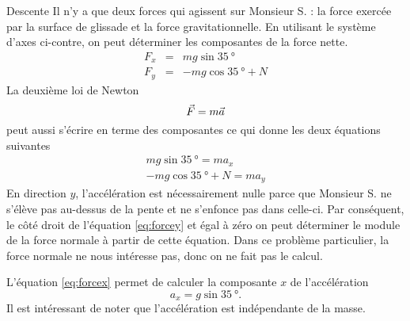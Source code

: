 \documentclass{tufte-handout}
\begin{document}
{\begin{subsection}{Descente}
    Il n'y a que deux forces qui agissent sur Monsieur S. : la force exercée
    par la surface de glissade et la force gravitationnelle. En utilisant le
    système d'axes ci-contre, on peut déterminer les composantes de la force
    nette.
    \begin{eqnarray*}
      F_x &=& mg \sin \SI{35}{\degree} \\
      F_y &=& -mg \cos \SI{35}{\degree} + N
    \end{eqnarray*}
    La deuxième loi de Newton
    \begin{equation*}
      \vec{F} = m\vec{a}
    \end{equation*}
    peut aussi s'écrire en terme des composantes ce qui donne les deux
    équations suivantes
    \begin{align}
      mg \sin \SI{35}{\degree} = ma_x      \label{eq:forcex} \\
      -mg \cos \SI{35}{\degree} + N = ma_y \label{eq:forcey}
    \end{align}
    En direction $y$, l'accélération est nécessairement nulle parce que
    Monsieur S. ne s'élève pas au-dessus de la pente et ne s'enfonce pas dans
    celle-ci. Par conséquent, le côté droit de l'équation \ref{eq:forcey} et
    égal à zéro on peut déterminer le module de la force normale à partir de
    cette équation. Dans ce problème particulier, la force normale ne nous
    intéresse pas, donc on ne fait pas le calcul.

    L'équation \ref{eq:forcex} permet de calculer la composante $x$ de
    l'accélération
    \begin{equation}
      \label{eq:accx}
      a_x = g\sin\SI{35}{\degree}.
    \end{equation}
    Il est intéressant de noter que l'accélération est indépendante de la
    masse.


\end{subsection}}
\end{document}
